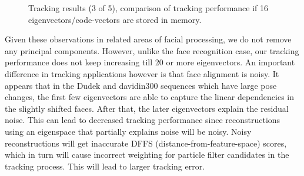 								\begin{figure}[t]
								\centering
								
								\caption{Tracking results (3 of 5), comparison of tracking performance if 16 eigenvectors/code-vectors are stored in memory.}
								\label{fig:results_final_3_16}
								\end{figure}

Given these observations in related areas of facial processing, we do not remove any principal components.  However, unlike the face recognition case, our tracking performance does not keep increasing till 20 or more eigenvectors.  An important difference in tracking applications however is that face alignment is noisy.  It appears that in the Dudek and davidin300 sequences which have large pose changes, the first few eigenvectors are able to capture the linear dependencies in the slightly shifted faces.  After that, the later eigenvectors explain the residual noise.  This can lead to decreased tracking performance since reconstructions using an eigenspace that partially explains noise will be noisy.  Noisy reconstructions will get inaccurate DFFS (distance-from-feature-space) scores, which in turn will cause incorrect weighting for particle filter candidates in the tracking process.  This will lead to larger tracking error.


